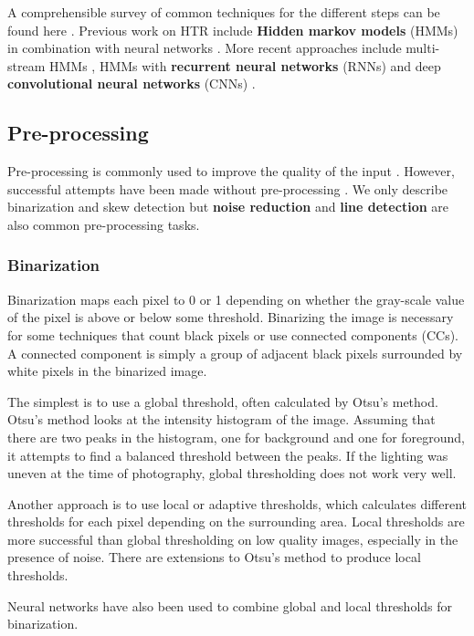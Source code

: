 A comprehensible survey of common techniques for the different steps can be found here \cite{HWR_survey}.
Previous work on HTR include \textbf{Hidden markov models} (HMMs) in combination with neural networks \cite{Offline_HWR_HMM_ANN}.
More recent approaches include multi-stream HMMs \cite{HWR_multi_stream_HMM_arabic}, HMMs with \textbf{recurrent neural networks} (RNNs) \cite{Offline_HWR_RNN} and deep \textbf{convolutional neural networks} (CNNs) \cite{offline_HWR_CNN}.

\subsection{Pre-processing}

Pre-processing is commonly used to improve the quality of the input \cite{HWR_survey}. However, successful attempts have been made without pre-processing \cite{FornesCnnCategorization}. We only describe binarization and skew detection but \textbf{noise reduction} and \textbf{line detection} are also common pre-processing tasks.

\subsubsection{Binarization}

Binarization maps each pixel to 0 or 1 depending on whether the gray-scale value of the pixel is above or below some threshold.
Binarizing the image is necessary for some techniques that count black pixels
or use connected components (CCs). A connected component is simply a group of adjacent black pixels surrounded by white pixels in the binarized image.

The simplest is to use a global threshold, often calculated by Otsu's method. Otsu's method looks at the intensity histogram of the image. Assuming that there are two peaks in the histogram, one for background and one for foreground, it attempts to find a balanced threshold between the peaks. If the lighting was uneven at the time of photography, global thresholding does not work very well.

Another approach is to use local or adaptive thresholds, which calculates different thresholds for each pixel depending on the surrounding area. Local thresholds are more successful than global thresholding on low quality images, especially in the presence of noise. There are extensions to Otsu's method to produce local thresholds.

Neural networks have also been used to combine global and local thresholds for binarization.

